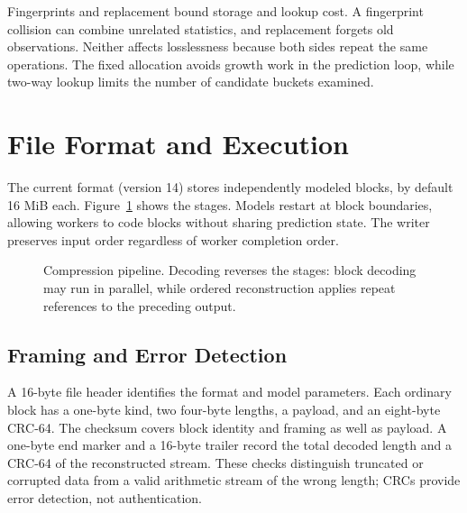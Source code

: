 \documentclass[10pt,letterpaper]{article}
\begin{document}
Fingerprints and replacement bound storage and lookup cost. A fingerprint collision can combine unrelated statistics, and replacement forgets old observations. Neither affects losslessness because both sides repeat the same operations. The fixed allocation avoids growth work in the prediction loop, while two-way lookup limits the number of candidate buckets examined.

\section{File Format and Execution}\label{sec:container}
The current format (version 14) stores independently modeled blocks, by default 16 MiB each. Figure~\ref{fig:pipeline} shows the stages. Models restart at block boundaries, allowing workers to code blocks without sharing prediction state. The writer preserves input order regardless of worker completion order.

\begin{figure}[htbp]
\centering
{}
\caption{Compression pipeline. Decoding reverses the stages: block decoding may run in parallel, while ordered reconstruction applies repeat references to the preceding output.}\label{fig:pipeline}
\end{figure}

\subsection{Framing and Error Detection}
A 16-byte file header identifies the format and model parameters. Each ordinary block has a one-byte kind, two four-byte lengths, a payload, and an eight-byte CRC-64. The checksum covers block identity and framing as well as payload. A one-byte end marker and a 16-byte trailer record the total decoded length and a CRC-64 of the reconstructed stream. These checks distinguish truncated or corrupted data from a valid arithmetic stream of the wrong length; CRCs provide error detection, not authentication.
\end{document}
